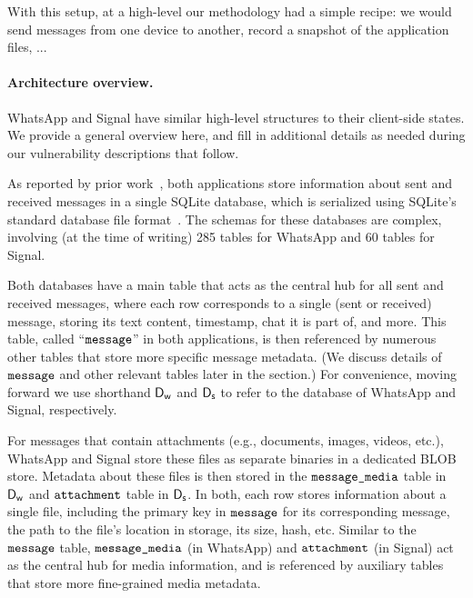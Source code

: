 With this setup, at a high-level our methodology had a simple recipe: we would send messages from one device to another, record a snapshot of the application files, ... 


\paragraph{Architecture overview.} WhatsApp and Signal have similar high-level structures to their client-side states. We provide a general overview here, and fill in additional details as needed during our vulnerability descriptions that follow. 

As reported by prior work~\cite{fabrega2024exploiting}, both applications store information about sent and received messages in a single SQLite database, which is serialized using SQLite's standard database file format~\cite{sqlite-database-file-format}. The schemas for these databases are complex, involving (at the time of writing) 285 tables for WhatsApp and 60 tables for Signal.


Both databases have a main table that acts as the central hub for all sent and received messages, where each row corresponds to a single (sent or received) message, storing its text content, timestamp, chat it is part of, and more. This table, called ``$\texttt{message}$'' in both applications, is then referenced by numerous other tables that store more specific message metadata. (We discuss details of $\texttt{message}$ and other relevant tables later in the section.) For convenience, moving forward we use shorthand $\textsf{D}_{\textsf{w}}$ and $\textsf{D}_{\textsf{s}}$ to refer to the database of WhatsApp and Signal, respectively.

For messages that contain attachments (e.g., documents, images, videos, etc.), WhatsApp and Signal store these files as separate binaries in a dedicated BLOB store. Metadata about these files is then stored in the $\texttt{message\_media}$ table in $\textsf{D}_{\textsf{w}}$ and $\texttt{attachment}$ table in $\textsf{D}_{\textsf{s}}$. In both, each row stores information about a single file, including the primary key in $\texttt{message}$ for its corresponding message, the path to the file's location in storage, its size, hash, etc. Similar to the $\texttt{message}$ table, $\texttt{message\_media}$ (in WhatsApp) and $\texttt{attachment}$ (in Signal) act as the central hub for media information, and is referenced by auxiliary tables that store more fine-grained media metadata.

